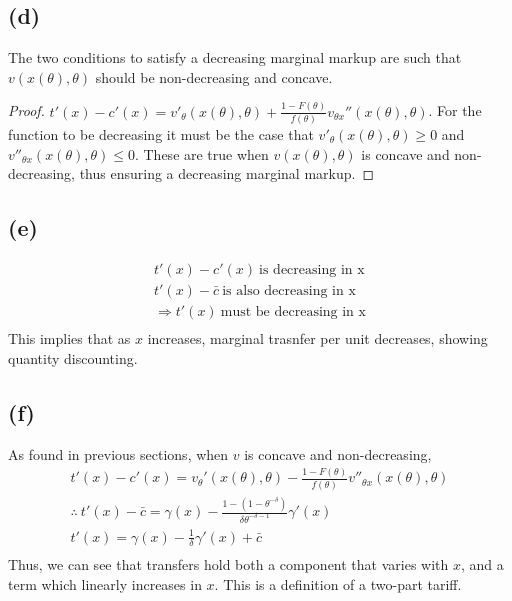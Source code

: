 \documentclass[10pt,a4paper]{article}
\begin{document}
  \subsection*{(d)}
    The two conditions to satisfy a decreasing marginal markup are such that $v(x(\theta),\theta)$ should be non-decreasing and concave. 
    \begin{proof}
      $t'(x) - c'(x) = v'_{\theta}(x(\theta),\theta) + \frac{1-F(\theta)}{f(\theta)}v_{\theta x}''(x(\theta),\theta)$. For the function to be decreasing it must be the case that $v'_{\theta}(x(\theta),\theta)\geq0$ and $v''_{\theta x}(x(\theta),\theta)\leq0$. These are true when $v(x(\theta),\theta)$ is concave and non-decreasing, thus ensuring a decreasing marginal markup. 
    \end{proof}
  \subsection*{(e)} 
    \begin{gather*}
      t'(x) - c'(x) \ \text{is decreasing in x} \\
      t'(x) - \bar{c} \ \text{is also decreasing in x} \\
      \Rightarrow t'(x) \ \text{must be decreasing in x} \\
    \end{gather*}
    This implies that as $x$ increases, marginal trasnfer per unit decreases, showing quantity discounting. 
  \subsection*{(f)}
    As found in previous sections, when $v$ is concave and non-decreasing,
    \begin{gather*}
      t'(x)-c'(x) = v_{\theta}'(x(\theta),\theta) - \frac{1-
      F(\theta)}{f(\theta)}v''_{\theta x}(x(\theta),\theta) \\
      \therefore \ t'(x) - \bar{c} = \gamma(x) - \frac{1 - (1-\theta^{-
      \delta})}{\delta\theta^{-\delta-1}}\gamma'(x) \\
      t'(x) = \gamma(x) - \frac{1}{\delta}\gamma'(x) + \bar{c} \\
    \end{gather*}
    Thus, we can see that transfers hold both a component that varies with $x$, and a term which linearly increases in $x$. This is a definition of a two-part tariff.
\end{document}

